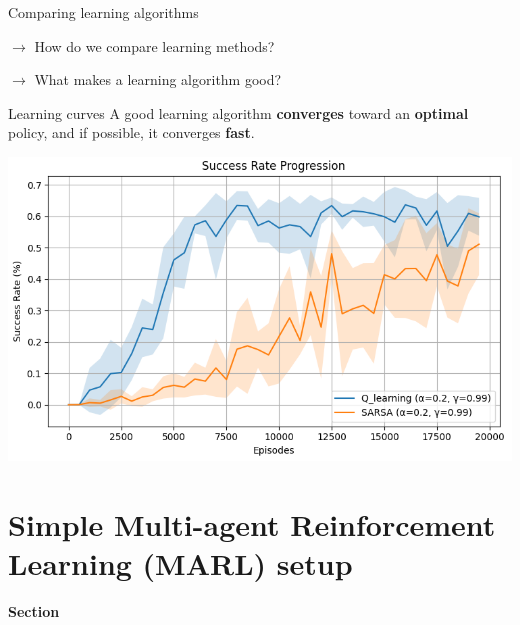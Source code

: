 \documentclass[aspectratio=169,xcolor=dvipsnames]{beamer}
\begin{document}
       
\begin{frame}{Comparing learning algorithms}

$\to$ How do we compare learning methods?  

$\to$ What makes a learning algorithm good? 

\begin{block}{Learning curves}
    A good learning algorithm \textbf{converges} toward an \textbf{optimal} policy, and if possible, it converges \textbf{fast}.


    \begin{minipage}{\textwidth}
        \centering
        \includegraphics[scale=0.4]{images/comparison_sarsa_Q.png}
    \end{minipage}%
    
\end{block}

\end{frame}


\section{Simple Multi-agent Reinforcement Learning (MARL) setup}

\begin{frame}[plain]
    \vspace{0.15\textheight}
    \begin{center}
        {\bfseries Section \thesection} 
        
        \vspace{0.5cm} 
        
        {\Large\bfseries\insertsectionhead} 
    \end{center}
\end{frame}
\end{document}
